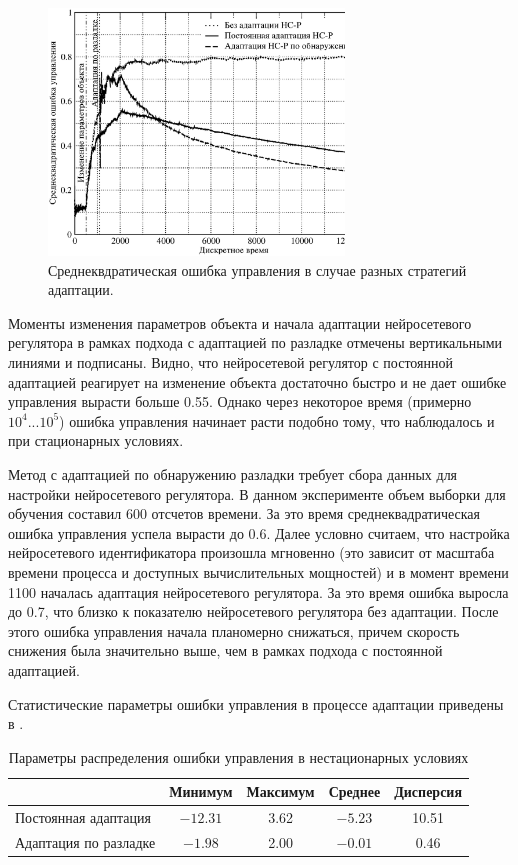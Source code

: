 \begin{figure}[h]
\centering
\includegraphics[width=0.7\textwidth,%
  height=0.3\textheight]{nonst_cmp_pa_ma_rus}
\caption{Среднеквдратическая ошибка управления в случае разных
  стратегий адаптации.}
\label{fig:nonst_cmp_pa_ma_rus}
\end{figure}

Моменты изменения параметров объекта и начала адаптации нейросетевого
регулятора в рамках подхода с адаптацией по разладке отмечены
вертикальными линиями и подписаны.  Видно, что нейросетевой регулятор
с постоянной адаптацией реагирует на изменение объекта достаточно
быстро и не дает ошибке управления вырасти больше 0.55.  Однако через
некоторое время (примерно $10^4...10^5$) ошибка управления начинает
расти подобно тому, что наблюдалось и при стационарных условиях.

Метод с адаптацией по обнаружению разладки требует сбора данных для
настройки нейросетевого регулятора.  В данном эксперименте объем
выборки для обучения составил 600 отсчетов времени.  За это время
среднеквадратическая ошибка управления успела вырасти до 0.6.  Далее
условно считаем, что настройка нейросетевого идентификатора произошла
мгновенно (это зависит от масштаба времени процесса и доступных
вычислительных мощностей) и в момент времени 1100 началась адаптация
нейросетевого регулятора.  За это время ошибка выросла до 0.7, что
близко к показателю нейросетевого регулятора без адаптации.  После
этого ошибка управления начала планомерно снижаться, причем скорость
снижения была значительно выше, чем в рамках подхода с постоянной
адаптацией.

Статистические параметры ошибки управления в процессе адаптации
приведены в .

\begin{table}
  \caption{Параметры распределения ошибки управления в нестационарных условиях}
  \label{tabl:nonst_state_distrib}
  \begin{tabular}{|l|c|c|c|c|}
    \hline
    &Минимум&Максимум&Среднее&Дисперсия\\
    \hline
    Постоянная адаптация&
    $-12.31$ & 3.62 & $-5.23$ & 10.51\\
    \hline
    Адаптация по разладке&
    $-1.98$ & 2.00 & $-0.01$ & 0.46\\
    \hline
  \end{tabular}
\end{table}

